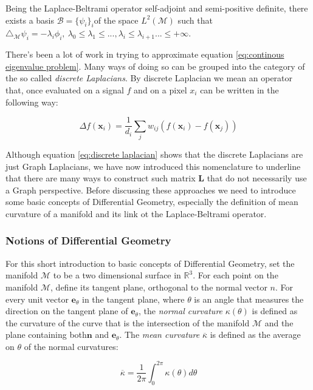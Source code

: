 Being the Laplace-Beltrami operator self-adjoint and semi-positive definite, there exists a basis $\mathcal B=\{\psi_i\}_i$of the space $L^2(\mathcal M)$ such that $\triangle_\mathcal M \psi_i = -\lambda_i\phi_i,\ \lambda_0\leq\lambda_1\leq...,\lambda_i\leq\lambda_{i+1}...\leq+\infty$.

There's been a lot of work in trying to approximate equation \ref{eq:continous eigenvalue problem}. Many ways of doing so can be grouped into the category of the so called \textit{discrete Laplacians}. By discrete Laplacian we mean an operator that, once evaluated on a signal $f$ and on a pixel $x_i$ can be written in the following way:

\begin{equation}\label{eq:discrete laplacian}
	\Delta f\left(\mathbf{x}_{i}\right)=\frac{1}{d_{i}} \sum_{j} w_{i j}\left(f\left(\mathbf{x}_{i}\right)-f\left(\mathbf{x}_{j}\right)\right)
\end{equation}

Although equation \ref{eq:discrete laplacian} shows that the discrete Laplacians are just Graph Laplacians, we have now introduced this nomenclature to underline that there are many ways to construct such matrix $\mathbf L$ that do not necessarily use a Graph perspective. Before discussing these approaches we need to introduce some basic concepts of Differential Geometry, especially the definition of mean curvature of a manifold and its link ot the Laplace-Beltrami operator.



\subsubsection{Notions of Differential Geometry}
 For this short introduction to basic concepts of Differential Geometry, set the manifold $\mathcal M$ to be a two dimensional surface in $\mathbb R^3$. For each point on the manifold $\mathcal M$, define its tangent plane, orthogonal to the normal vector $n$. For every unit vector $\mathbf e_\theta$ in the tangent plane, where $\theta$ is an angle that measures the direction on the tangent plane of $\mathbf e_\theta$, the \textit{normal curvature} $\kappa(\theta)$ is defined as the curvature of the curve that is the intersection of the manifold $\mathcal M$ and the plane containing both$\mathbf n$ and $\mathbf e_\theta$. The \textit{mean curvature} $\overline \kappa $ is defined as the average on $\theta$ of the normal curvatures:
 
 \begin{equation}\label{eq:mean curvature}
 	\overline \kappa=\frac{1}{2 \pi} \int_{0}^{2 \pi} \kappa(\theta) d \theta
 \end{equation}

